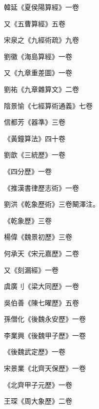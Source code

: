 \begin{pinyinscope}
 韓延《夏侯陽算經》一卷



 又《五曹算經》五卷



 宋泉之《九經術疏》九卷



 劉徽《海島算經》一卷



 又《九章重差圖》一卷



 劉祐《九章雜算文》二卷



 陰景愉《七經算術通義》七卷



 信都芳《器準》三卷



 《黃鐘算法》四十卷



 劉歆《三統歷》一卷



 《四分歷》一卷



 《推漢書律歷志術》一卷



 劉洪《乾象歷術》三卷闞澤注。



 《乾象歷》三卷



 楊偉《魏景初歷》三卷



 何承天《宋元嘉歷》二卷



 又《刻漏經》一卷



 虞廣刂《梁大同歷》一卷



 吳伯善《陳七曜歷》五卷



 孫僧化《後魏永安歷》一卷



 李業興《後魏甲子歷》一卷



 《後魏武定歷》一卷



 宋景業《北齊天保歷》一卷



 《北齊甲子元歷》一卷



 王琛《周大象歷》二卷




\end{pinyinscope}
